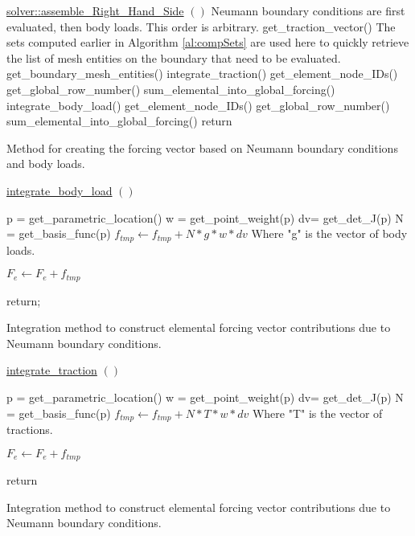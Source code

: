 \documentclass[a4paper, 12pt]{article}
\begin{document}
\vspace{\baselineskip}
\begin{algorithm}[H]
  \underline{solver::assemble\_Right\_Hand\_Side} $()$
  \BlankLine
  \tcc
  {
    Neumann boundary conditions are first evaluated, 
    then body loads. This order is arbitrary.
  }
  {
    get\_traction\_vector()\;
    \tcc
    {
      The sets computed earlier in Algorithm \ref{al:compSets}
      are used here to quickly 
      retrieve the list of mesh entities on the boundary 
      that need to be evaluated.
    }
    get\_boundary\_mesh\_entities()\;
    {
      integrate\_traction()\;
      get\_element\_node\_IDs()\;
      {
        get\_global\_row\_number()\;
        sum\_elemental\_into\_global\_forcing()\;
      }
    }
  }
  {
    integrate\_body\_load()\;
    get\_element\_node\_IDs()\;
    {
      get\_global\_row\_number()\;
      sum\_elemental\_into\_global\_forcing()\;
    }
  }
  return\;
  \caption{Method for creating the forcing vector based on Neumann boundary
            conditions and body loads.}
  \label{al:AssembleRHS}
\end{algorithm}

\vspace{\baselineskip}
\begin{algorithm} 
  \underline{integrate\_body\_load} $()$
  \BlankLine
  {
    p = get\_parametric\_location()\;
    w = get\_point\_weight(p)\;
    dv= get\_det\_J(p)\;
    N = get\_basis\_func(p)\;
    {
      {
        $f_{tmp} \leftarrow f_{tmp} + N * g * w * dv$ \;
        \tcc
        {
          Where "g" is the vector of body loads.
        }
      }
    }

    $F_e \leftarrow F_e + f_{tmp}$\;
  }
  return;
  \caption{Integration method to construct elemental forcing vector
            contributions due to Neumann boundary conditions.}
  \label{al:BLC_int}
\end{algorithm}

\vspace{\baselineskip}
\begin{algorithm} 
  \underline{integrate\_traction} $()$
  \BlankLine
  {
    p = get\_parametric\_location()\;
    w = get\_point\_weight(p)\;
    dv= get\_det\_J(p)\;
    N = get\_basis\_func(p)\;
    {
      {
        $f_{tmp} \leftarrow f_{tmp} + N * T * w * dv$ \;
        \tcc
        {
          Where "T" is the vector of tractions.
        }
      }
    }

    $F_e \leftarrow F_e + f_{tmp}$\;
  }
  return\;
  \caption{Integration method to construct elemental forcing vector
            contributions due to Neumann boundary conditions.}
  \label{al:NBC_int}
\end{algorithm}
\end{document}
